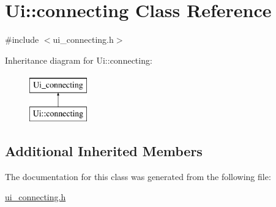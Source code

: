 \hypertarget{classUi_1_1connecting}{\section{Ui\-:\-:connecting Class Reference}
\label{classUi_1_1connecting}
}


{\ttfamily \#include $<$ui\-\_\-connecting.\-h$>$}

Inheritance diagram for Ui\-:\-:connecting\-:\begin{figure}[H]
\begin{center}
\leavevmode
\includegraphics[height=2.000000cm]{classUi_1_1connecting}
\end{center}
\end{figure}
\subsection*{Additional Inherited Members}


The documentation for this class was generated from the following file\-:\begin{DoxyCompactItemize}
\item 
\hyperlink{ui__connecting_8h}{ui\-\_\-connecting.\-h}\end{DoxyCompactItemize}
